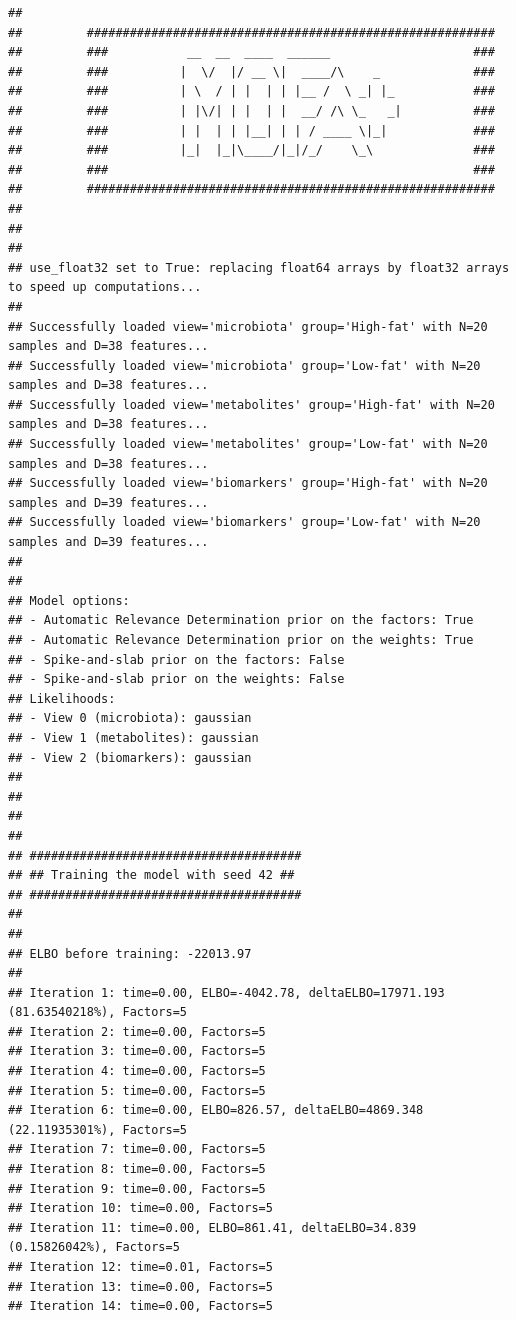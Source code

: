 \documentclass[
]{book}
\begin{document}
\begin{verbatim}
## 
##         #########################################################
##         ###           __  __  ____  ______                    ### 
##         ###          |  \/  |/ __ \|  ____/\    _             ### 
##         ###          | \  / | |  | | |__ /  \ _| |_           ### 
##         ###          | |\/| | |  | |  __/ /\ \_   _|          ###
##         ###          | |  | | |__| | | / ____ \|_|            ###
##         ###          |_|  |_|\____/|_|/_/    \_\              ###
##         ###                                                   ### 
##         ######################################################### 
##        
##  
##         
## use_float32 set to True: replacing float64 arrays by float32 arrays to speed up computations...
## 
## Successfully loaded view='microbiota' group='High-fat' with N=20 samples and D=38 features...
## Successfully loaded view='microbiota' group='Low-fat' with N=20 samples and D=38 features...
## Successfully loaded view='metabolites' group='High-fat' with N=20 samples and D=38 features...
## Successfully loaded view='metabolites' group='Low-fat' with N=20 samples and D=38 features...
## Successfully loaded view='biomarkers' group='High-fat' with N=20 samples and D=39 features...
## Successfully loaded view='biomarkers' group='Low-fat' with N=20 samples and D=39 features...
## 
## 
## Model options:
## - Automatic Relevance Determination prior on the factors: True
## - Automatic Relevance Determination prior on the weights: True
## - Spike-and-slab prior on the factors: False
## - Spike-and-slab prior on the weights: False
## Likelihoods:
## - View 0 (microbiota): gaussian
## - View 1 (metabolites): gaussian
## - View 2 (biomarkers): gaussian
## 
## 
## 
## 
## ######################################
## ## Training the model with seed 42 ##
## ######################################
## 
## 
## ELBO before training: -22013.97 
## 
## Iteration 1: time=0.00, ELBO=-4042.78, deltaELBO=17971.193 (81.63540218%), Factors=5
## Iteration 2: time=0.00, Factors=5
## Iteration 3: time=0.00, Factors=5
## Iteration 4: time=0.00, Factors=5
## Iteration 5: time=0.00, Factors=5
## Iteration 6: time=0.00, ELBO=826.57, deltaELBO=4869.348 (22.11935301%), Factors=5
## Iteration 7: time=0.00, Factors=5
## Iteration 8: time=0.00, Factors=5
## Iteration 9: time=0.00, Factors=5
## Iteration 10: time=0.00, Factors=5
## Iteration 11: time=0.00, ELBO=861.41, deltaELBO=34.839 (0.15826042%), Factors=5
## Iteration 12: time=0.01, Factors=5
## Iteration 13: time=0.00, Factors=5
## Iteration 14: time=0.00, Factors=5

\end{verbatim}
\end{document}
